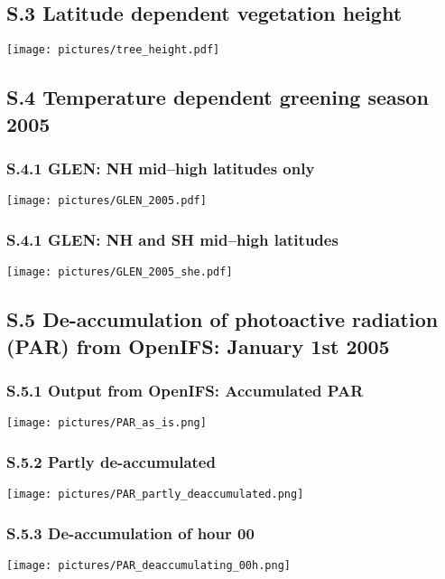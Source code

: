\documentclass[manuscript]{copernicus}
\begin{document}
\subsection*{S.3 Latitude dependent vegetation height}
\appendixfigures
\begin{center}
  \texttt{[image: pictures/tree\_height.pdf]}
\end{center}

\subsection*{S.4 Temperature dependent greening season 2005}
\subsubsection*{S.4.1 GLEN: NH mid--high latitudes only}
\appendixfigures
\begin{center}
  \texttt{[image: pictures/GLEN\_2005.pdf]}
\end{center}
\subsubsection*{S.4.1 GLEN: NH and SH mid--high latitudes}
\appendixfigures
\begin{center}
  \texttt{[image: pictures/GLEN\_2005\_she.pdf]}
\end{center}

\subsection*{S.5 De-accumulation of photoactive radiation (PAR) from OpenIFS: January 1st 2005}
\subsubsection*{S.5.1 Output from OpenIFS: Accumulated PAR}
\appendixfigures
\begin{center}
  \texttt{[image: pictures/PAR\_as\_is.png]}
\end{center}
\subsubsection*{S.5.2 Partly de-accumulated}
\appendixfigures
\begin{center}
  \texttt{[image: pictures/PAR\_partly\_deaccumulated.png]}
\end{center}
\subsubsection*{S.5.3 De-accumulation of hour 00}
\appendixfigures
\begin{center}
  \texttt{[image: pictures/PAR\_deaccumulating\_00h.png]}
\end{center}
\end{document}
